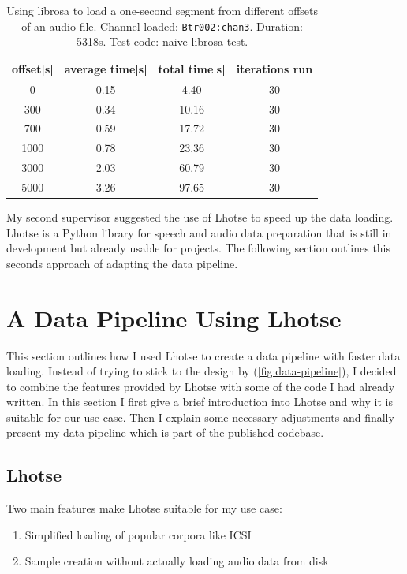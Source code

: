 \documentclass[bsc,frontabs,parskip,deptreport]{infthesis}
\newcommand{\coderepo}{\href{https://github.com/LasseWolter/laughter-detection-icsi}{codebase}}
\begin{document}
\begin{table}[h!]
    \centering
    \begin{tabular}{|c|c|c|c|}
    \hline
    offset[s] & average time[s] & total time[s] & iterations run \\
    \hline
    0  & 0.15 & 4.40 & 30    \\
    300 & 0.34 & 10.16 & 30  \\ 
    700 & 0.59 & 17.72 & 30  \\
    1000 & 0.78 & 23.36 & 30 \\  
    3000 & 2.03 & 60.79 & 30 \\
    5000 & 3.26 & 97.65 & 30 \\
    \hline
    \end{tabular}
    \caption{Using librosa \citep{mcfee2015librosa} to load a one-second segment from different offsets of an audio-file. Channel loaded: \texttt{Btr002:chan3}. Duration: 5318s. Test code: \href{https://github.com/LasseWolter/laughter-detection-icsi/tree/main/misc_scripts}{naive librosa-test}.}
    \label{tab:librosa-loading-times}
\end{table}


My second supervisor suggested the use of Lhotse \citep{zelasko2021lhotse} to speed up the data loading. Lhotse is a Python library for speech and audio data preparation that is still in development but already usable for projects. The following section outlines this seconds approach of adapting the data pipeline.

\section{A Data Pipeline Using Lhotse}
This section outlines how I used Lhotse to create a data pipeline with faster data loading. Instead of trying to stick to the design by \citet{gillick2021robust} (\autoref{fig:data-pipeline}), I decided to combine the features provided by Lhotse with some of the code I had already written. 
In this section I first give a brief introduction into Lhotse and why it is suitable for our use case. Then I explain some necessary adjustments and finally present my data pipeline which is part of the published \coderepo.

\subsection{Lhotse} \label{sec:lhotse}
Two main features make Lhotse suitable for my use case:
\begin{enumerate}
    \item Simplified loading of popular corpora like ICSI
    \item Sample creation without actually loading audio data from disk
\end{enumerate}
\end{document}
